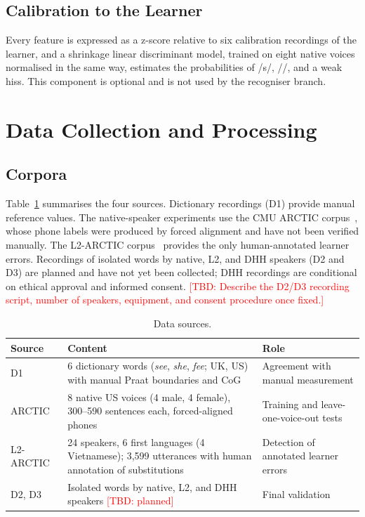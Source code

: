 \documentclass[conference]{IEEEtran}
\newcommand{\tbd}[1]{\textcolor{red}{[TBD: #1]}}
\newcommand{\ipa}[1]{/#1/}
\begin{document}
\subsection{Calibration to the Learner}
Every feature is expressed as a z-score relative to six calibration recordings of the learner, and a shrinkage linear discriminant model, trained on eight native voices normalised in the same way, estimates the probabilities of \ipa{s}, \ipa{\textesh}, and a weak hiss. This component is optional and is not used by the recogniser branch.

\section{Data Collection and Processing}
\subsection{Corpora}
Table~\ref{tab:corpora} summarises the four sources. Dictionary recordings (D1) provide manual reference values. The native-speaker experiments use the CMU ARCTIC corpus~\cite{kominek2004}, whose phone labels were produced by forced alignment and have not been verified manually. The L2-ARCTIC corpus~\cite{zhao2018} provides the only human-annotated learner errors. Recordings of isolated words by native, L2, and DHH speakers (D2 and D3) are planned and have not yet been collected; DHH recordings are conditional on ethical approval and informed consent. \tbd{Describe the D2/D3 recording script, number of speakers, equipment, and consent procedure once fixed.}

\begin{table}[!htb]
\caption{Data sources.}
\label{tab:corpora}
\centering
\footnotesize
\begin{tabular}{p{1.6cm}p{2.9cm}p{3.1cm}}
\toprule
Source & Content & Role \\
\midrule
D1 & 6 dictionary words (\textit{see}, \textit{she}, \textit{fee}; UK, US) with manual Praat boundaries and CoG & Agreement with manual measurement \\
ARCTIC~\cite{kominek2004} & 8 native US voices (4 male, 4 female), 300--590 sentences each, forced-aligned phones & Training and leave-one-voice-out tests \\
L2-ARCTIC & 24 speakers, 6 first languages (4 Vietnamese); 3{,}599 utterances with human annotation of substitutions & Detection of annotated learner errors \\
D2, D3 & Isolated words by native, L2, and DHH speakers \tbd{planned} & Final validation \\
\bottomrule
\end{tabular}
\end{table}
\end{document}
